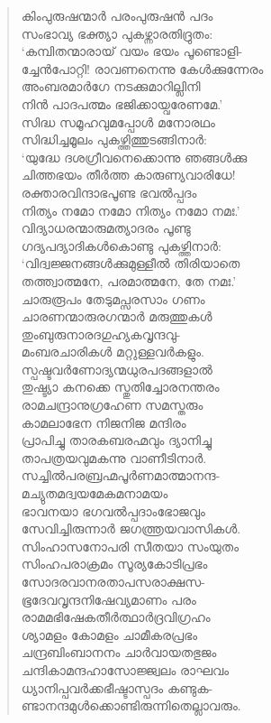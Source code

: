 \begin{verse}
കിംപുരുഷന്മാര്‍ പരംപുരുഷന്‍ പദം\\
സംഭാവ്യ ഭക്ത്യാ പുകഴ്ന്നാരതിദ്രുതം:\\
‘കമ്പിതന്മാരായ് വയം ഭയം പൂണ്ടൊളി-\\
ച്ചേന്‍പോറ്റി! രാവണനെന്നു കേള്‍ക്കുന്നേരം\\
അംബരമാര്‍ഗേ നടക്കുമാറില്ലിനി\\
നിന്‍ പാദപത്മം ഭജിക്കായ്വരേണമേ.’\\
സിദ്ധ സമൂഹവുമപ്പോള്‍ മനോരഥം\\
സിദ്ധിച്ചമൂലം പുകഴ്ത്തിത്തുടങ്ങിനാര്‍:\\
‘യുദ്ധേ ദശഗ്രീവനെക്കൊന്നു ഞങ്ങള്‍ക്കു\\
ചിത്തഭയം തീര്‍ത്ത കാരുണ്യവാരിധേ!\\
രക്താരവിന്ദാഭപൂണ്ട ഭവല്‍പ്പദം\\
നിത്യം നമോ നമോ നിത്യം നമോ നമഃ.’\\
വിദ്യാധരന്മാരുമത്യാദരം പൂണ്ടു\\
ഗദ്യപദ്യാദികള്‍കൊണ്ടു പുകഴ്ത്തിനാര്‍:\\
‘വിദ്വജ്ജനങ്ങള്‍ക്കുമുള്ളീല്‍ തിരിയാതെ\\
തത്ത്വാത്മനേ, പരമാത്മനേ, തേ നമഃ.’\\
ചാരുരൂപം തേടുമപ്സരസാം ഗണം\\
ചാരണന്മാരുരഗന്മാര്‍ മരുത്തുകള്‍\\
തുംബുരുനാരദഗുഹ്യകവൃന്ദവു-\\
മംബരചാരികള്‍ മറ്റുള്ളവര്‍കളും.\\
സ്പഷ്ടവര്‍ണോദ്യന്മധുരപദങ്ങളാല്‍\\
തുഷ്ട്യാ കനക്കെ സ്തുതിച്ചോരനന്തരം\\
രാമചന്ദ്രാനുഗ്രഹേണ സമസ്തരും\\
കാമലാഭേന നിജനിജ മന്ദിരം\\
പ്രാപിച്ചു താരകബരഹ്മവും ദ്യാനിച്ചു\\
താപത്രയവുമകന്നു വാണീടിനാര്‍.\\
സച്ചില്‍പരബ്രഹ്മപൂര്‍ണമാത്മാനന്ദ-\\
മച്യുതമദ്വയമേകമനാമയം\\
ഭാവനയാ ഭഗവല്‍പ്പദാംഭോജവും\\
സേവിച്ചിരുന്നാര്‍ ജഗത്ത്രയവാസികള്‍.\\
സിംഹാസനോപരി സീതയാ സംയുതം\\
സിംഹപരാക്രമം സൂര്യകോടിപ്രഭം\\
സോദരവാനരതാപസരാക്ഷസ-\\
ഭൂദേവവൃന്ദനിഷേവ്യമാണം പരം\\
രാമമഭിഷേകതീര്‍ത്ഥാര്‍ദ്രവിഗ്രഹം\\
ശ്യാമളം കോമളം ചാമീകരപ്രഭം\\
ചന്ദ്രബിംബാനനം ചാര്‍വായതഭുജം\\
ചന്ദികാമന്ദഹാസോജ്ജ്വലം രാഘവം\\
ധ്യാനിപ്പവര്‍ക്കഭീഷ്ടാസ്പദം കണ്ടുക-\\
ണ്ടാനന്ദമുള്‍ക്കൊണ്ടിരുന്നിതെല്ലാവരും.
\end{verse}

